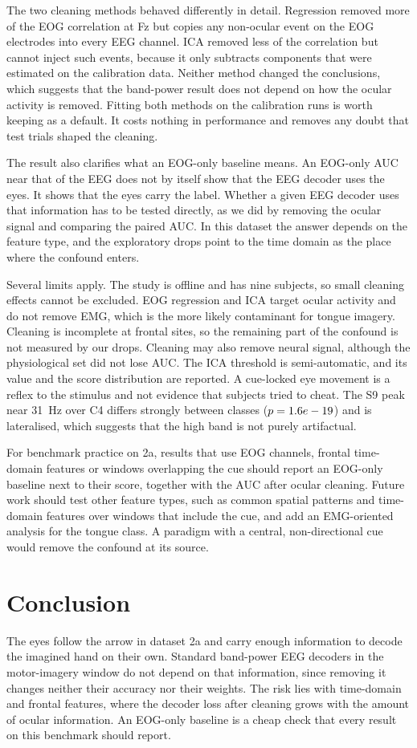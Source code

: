 \documentclass[conference]{IEEEtran}
\begin{document}
The two cleaning methods behaved differently in detail. Regression removed more of the EOG correlation at Fz but copies any non-ocular event on the EOG electrodes into every EEG channel. ICA removed less of the correlation but cannot inject such events, because it only subtracts components that were estimated on the calibration data. Neither method changed the conclusions, which suggests that the band-power result does not depend on how the ocular activity is removed. Fitting both methods on the calibration runs is worth keeping as a default. It costs nothing in performance and removes any doubt that test trials shaped the cleaning.

The result also clarifies what an EOG-only baseline means. An EOG-only AUC near that of the EEG does not by itself show that the EEG decoder uses the eyes. It shows that the eyes carry the label. Whether a given EEG decoder uses that information has to be tested directly, as we did by removing the ocular signal and comparing the paired AUC. In this dataset the answer depends on the feature type, and the exploratory drops point to the time domain as the place where the confound enters.

Several limits apply. The study is offline and has nine subjects, so small cleaning effects cannot be excluded. EOG regression and ICA target ocular activity and do not remove EMG, which is the more likely contaminant for tongue imagery. Cleaning is incomplete at frontal sites, so the remaining part of the confound is not measured by our drops. Cleaning may also remove neural signal, although the physiological set did not lose AUC. The ICA threshold is semi-automatic, and its value and the score distribution are reported. A cue-locked eye movement is a reflex to the stimulus and not evidence that subjects tried to cheat. The S9 peak near 31~Hz over C4 differs strongly between classes ($p=1.6e-19{}$) and is lateralised, which suggests that the high band is not purely artifactual.

For benchmark practice on 2a, results that use EOG channels, frontal time-domain features or windows overlapping the cue should report an EOG-only baseline next to their score, together with the AUC after ocular cleaning. Future work should test other feature types, such as common spatial patterns and time-domain features over windows that include the cue, and add an EMG-oriented analysis for the tongue class. A paradigm with a central, non-directional cue would remove the confound at its source.

\section{Conclusion}
The eyes follow the arrow in dataset 2a and carry enough information to decode the imagined hand on their own. Standard band-power EEG decoders in the motor-imagery window do not depend on that information, since removing it changes neither their accuracy nor their weights. The risk lies with time-domain and frontal features, where the decoder loss after cleaning grows with the amount of ocular information. An EOG-only baseline is a cheap check that every result on this benchmark should report.
\end{document}
